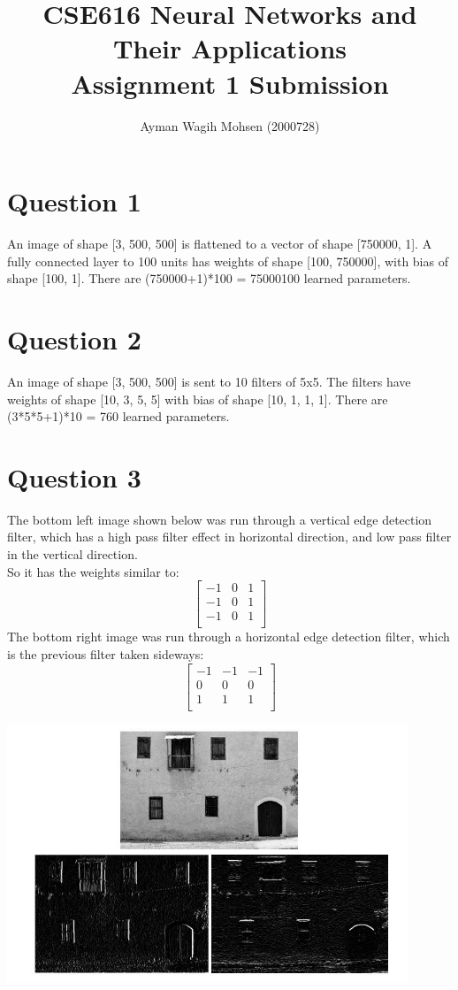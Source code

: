 \documentclass[10pt]{article}
\begin{document}
\title{CSE616 Neural Networks and Their Applications\\
Assignment 1 Submission}
\author{Ayman Wagih Mohsen (2000728)}
\maketitle

\section{Question 1}
An image of shape [3, 500, 500] is flattened to a vector of shape [750000, 1]. A fully connected layer to 100 units has weights of shape [100, 750000], with bias of shape [100, 1]. There are (750000+1)*100 = 75000100 learned parameters.
\section{Question 2}
An image of shape [3, 500, 500] is sent to 10 filters of 5x5. The filters have weights of shape [10, 3, 5, 5] with bias of shape [10, 1, 1, 1]. There are (3*5*5+1)*10 = 760 learned parameters.
\section{Question 3}
The bottom left image shown below was run through a vertical edge detection filter, which has a high pass filter effect in horizontal direction, and low pass filter in the vertical direction.\\

So it has the weights similar to:
\[
	\left[
	{
		\begin{array}{ccc}
		-1&0&1\\
		-1&0&1\\
		-1&0&1\\
		\end{array}
	}
	\right]
\]
The bottom right image was run through a horizontal edge detection filter, which is the previous filter taken sideways:
\[
	\left[
	{
		\begin{array}{ccc}
		-1&-1&-1\\
		0&0&0\\
		1&1&1\\
		\end{array}
	}
	\right]
\]
\begin{center}
\includegraphics[width=0.9\textwidth]{20220502 Q3.PNG}
\end{center}
\end{document}
